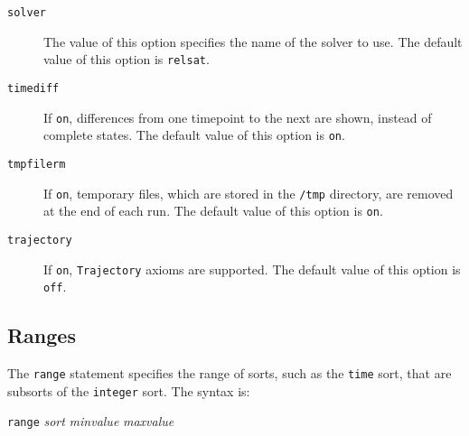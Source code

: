 \documentclass{article}
\begin{document}
\begin{description}
\item[{\tt solver}]
The value of this option specifies the name of the solver to use.
The default value of this option is {\tt relsat}.

\item[{\tt timediff}]
If {\tt on}, differences from one timepoint to the next are shown,
instead of complete states. The default value of this option is {\tt on}.

\item[{\tt tmpfilerm}]
If {\tt on}, temporary files, which are stored in the {\tt /tmp}
directory, are removed at the end of each run. The default value of
this option is {\tt on}.

\item[{\tt trajectory}]
If {\tt on}, {\tt Trajectory} axioms are supported.
The default value of this option is {\tt off}.


\end{description}

\subsection{Ranges}
The {\tt range} statement specifies the range of sorts, such as the
{\tt time} sort, that are subsorts of the {\tt integer} sort.
The syntax is:
\begin{flushleft}
{\tt range} {\em sort} {\em minvalue} {\em maxvalue}
\end{flushleft}


\end{document}
